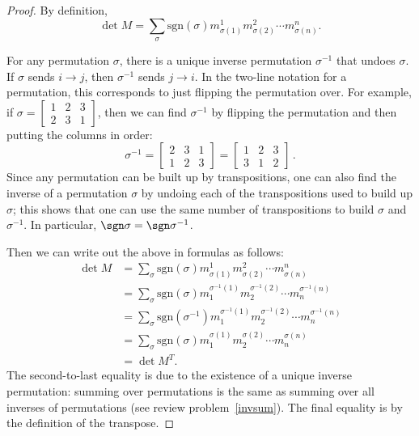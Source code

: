 \begin{proof}
  By definition, \[
\det M = \sum_{\sigma} \text{sgn}(\sigma) m^1_{\sigma(1)}m^2_{\sigma(2)}\cdots m^n_{\sigma(n)}.
\]

For any permutation $\sigma$, there is a unique inverse permutation $\sigma^{-1}$ that undoes $\sigma$.  If $\sigma$ sends $i\rightarrow j$, then $\sigma^{-1}$ sends $j\rightarrow i$.  In the two-line notation for a permutation, this corresponds to just flipping the permutation over.  For example, if $\sigma=\begin{bmatrix} 
1 & 2 & 3 \\
2 & 3 & 1
\end{bmatrix}$, then we can find $\sigma^{-1}$ by flipping the permutation and then putting the columns in order:
\[
\sigma^{-1}=\begin{bmatrix} 
2 & 3 & 1 \\
1 & 2 & 3
\end{bmatrix}=\begin{bmatrix} 
1 & 2 & 3 \\
3 & 1 & 2
\end{bmatrix}\, .
\]
Since any permutation can be built up by transpositions, one can also find the inverse of a permutation $\sigma$ by undoing each of the transpositions used to build up $\sigma$; this shows that one can use the same number of transpositions to build $\sigma$ and $\sigma^{-1}$.  In particular, $\sgn \sigma= \sgn \sigma^{-1}$.


Then we can write out the above in formulas as follows:
\begin{align*}
\det M &=\sum_{\sigma} \text{sgn}(\sigma) m^1_{\sigma(1)}m^2_{\sigma(2)}\cdots m^n_{\sigma(n)} \\
&=\sum_{\sigma} \text{sgn}(\sigma) m_1^{\sigma^{-1}(1)}m_2^{\sigma^{-1}(2)}\cdots m_n^{\sigma^{-1}(n)} \\
&=\sum_{\sigma} \text{sgn}(\sigma^{-1}) m_1^{\sigma^{-1}(1)}m_2^{\sigma^{-1}(2)}\cdots m_n^{\sigma^{-1}(n)} \\
&=\sum_{\sigma} \text{sgn}(\sigma) m_1^{\sigma(1)}m_2^{\sigma(2)}\cdots m_n^{\sigma(n)} \\
&=\det M^T.
\end{align*}
The second-to-last equality is due to the existence of a unique inverse permutation: summing over permutations is the same as summing over all inverses of permutations (see review problem~\ref{invsum}).  The final equality is by the definition of the transpose.
\end{proof}

